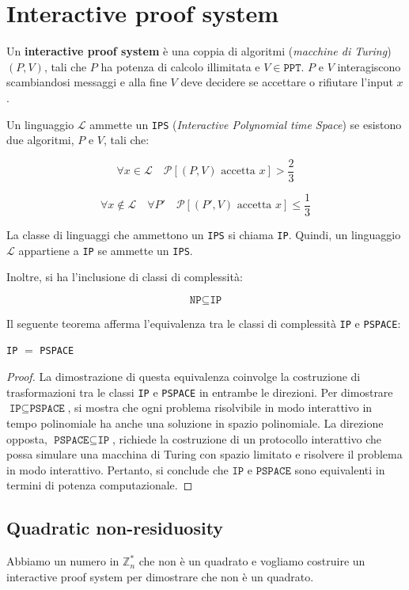 \section{Interactive proof system}
Un \textbf{interactive proof system} è una coppia di algoritmi (\textit{macchine di Turing}) $(P,V)$, tali 
che $P$ ha potenza di calcolo illimitata e $V \in \texttt{PPT}$. $P$ e $V$ interagiscono scambiandosi 
messaggi e alla fine $V$ deve decidere se accettare o rifiutare l'input $x$.

Un linguaggio $\mathcal{L}$ ammette un \texttt{IPS} (\textit{Interactive Polynomial time Space}) se
esistono due algoritmi, \(P\) e \(V\), tali che:

\[
\forall x \in \mathcal{L} \quad \mathcal{P}[(P,V) \text{ accetta } x] > \frac{2}{3}
\] 

\[
\forall x \notin \mathcal{L} \quad \forall P' \quad \mathcal{P}[(P',V) \text{ accetta } x] \leq \frac{1}{3}
\]

La classe di linguaggi che ammettono un \texttt{IPS} si chiama \texttt{IP}. Quindi, un linguaggio $\mathcal{L}$
appartiene a \texttt{IP} se ammette un \texttt{IPS}.

Inoltre, si ha l'inclusione di classi di complessità:

\[
\texttt{NP} \subseteq \texttt{IP}
\]

Il seguente teorema afferma l'equivalenza tra le classi di complessità
\texttt{IP} e \texttt{PSPACE}:

\begin{theorem}
    \texttt{IP} $=$ \texttt{PSPACE}
\end{theorem}
\begin{proof}
La dimostrazione di questa equivalenza coinvolge la costruzione di trasformazioni tra le classi \texttt{IP} e \texttt{PSPACE}
in entrambe le direzioni.
Per dimostrare \( \texttt{IP} \subseteq \texttt{PSPACE} \), si mostra che ogni problema risolvibile in modo interattivo
in tempo polinomiale ha anche una soluzione in spazio polinomiale.
La direzione opposta, \( \texttt{PSPACE} \subseteq \texttt{IP} \), richiede la costruzione di un protocollo interattivo
che possa simulare una macchina di Turing con spazio limitato e risolvere il problema in modo interattivo.
Pertanto, si conclude che \( \texttt{IP} \) e \( \texttt{PSPACE} \) sono equivalenti in termini di potenza computazionale.
\end{proof}
\subsection{Quadratic non-residuosity}
Abbiamo un numero in $\mathbb{Z}_n^*$ che non è un quadrato e vogliamo costruire un interactive proof system
per dimostrare che non è un quadrato.

